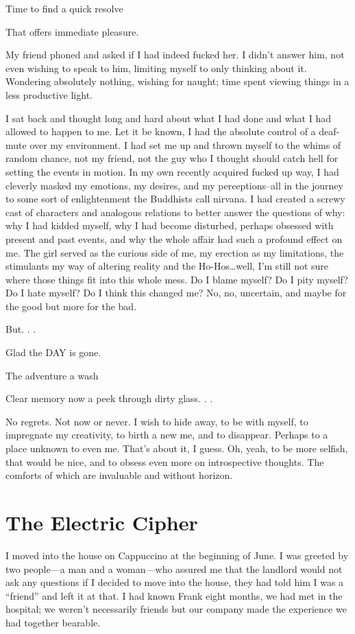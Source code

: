 Time to find a quick resolve

That offers immediate pleasure.

My friend phoned and asked if I had indeed fucked her. I didn't answer
him, not even wishing to speak to him, limiting myself to only thinking
about it. Wondering absolutely nothing, wishing for naught; time spent
viewing things in a less productive light.

I sat back and thought long and hard about what I had done and what I
had allowed to happen to me. Let it be known, I had the absolute control
of a deaf-mute over my environment. I had set me up and thrown myself to
the whims of random chance, not my friend, not the guy who I thought
should catch hell for setting the events in motion. In my own recently
acquired fucked up way, I had cleverly masked my emotions, my desires,
and my perceptions--all in the journey to some sort of enlightenment the
Buddhists call nirvana. I had created a screwy cast of characters and
analogous relations to better answer the questions of why: why I had
kidded myself, why I had become disturbed, perhaps obsessed with present
and past events, and why the whole affair had such a profound effect on
me. The girl served as the curious side of me, my erection as my
limitations, the stimulants my way of altering reality and the
Ho-Hos\ldots well, I'm still not sure where those things fit into this
whole mess. Do I blame myself? Do I pity myself? Do I hate myself? Do I
think this changed me? No, no, uncertain, and maybe for the good but
more for the bad.

But. . .

Glad the DAY is gone.

The adventure a wash

Clear memory now a peek through dirty glass. . .

No regrets. Not now or never. I wish to hide away, to be with myself, to
impregnate my creativity, to birth a new me, and to disappear. Perhaps
to a place unknown to even me. That's about it, I guess. Oh, yeah, to be
more selfish, that would be nice, and to obsess even more on
introspective thoughts. The comforts of which are invaluable and without
horizon.

\chapter{The Electric Cipher}\label{the-electric-cipher}

I moved into the house on Cappuccino at the beginning of June. I was
greeted by two people---a man and a woman---who assured me that the
landlord would not ask any questions if I decided to move into the
house, they had told him I was a ``friend'' and left it at that. I had
known Frank eight months, we had met in the hospital; we weren't
necessarily friends but our company made the experience we had together
bearable.

